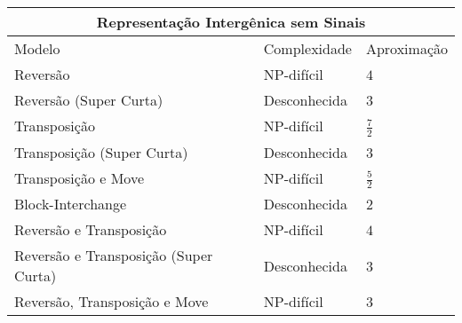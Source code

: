 \begin{table}[!htb]
  \begin{tabular}{|p{8cm}|p{3cm}|p{3cm}|}
    \hline
    \multicolumn{3}{|c|}{Representação Intergênica sem Sinais}                                                                                   \\ \hline
    Modelo                  & Complexidade                                 & Aproximação                                                         \\ \hline
    Reversão                                & NP-difícil~\cite{2020a-brito-etal}           & $4$~\cite{2020a-brito-etal}                         \\ \hline
    Reversão (Super Curta)                  & Desconhecida                                 & $3$~\cite{2019c-oliveira-etal}                      \\ \hline
    Transposição                            & NP-difícil~\cite{2021a-oliveira-etal}        & $\frac{7}{2}$~\cite{2021a-oliveira-etal}            \\ \hline
    Transposição (Super Curta)              & Desconhecida                                 & $3$~\cite{2019c-oliveira-etal}                      \\ \hline
    Transposição e Move                     & NP-difícil~\cite{2021a-oliveira-etal}        & $\frac{5}{2}$~\cite{2021a-oliveira-etal}            \\ \hline
    Block-Interchange                       & Desconhecida                                 & $2$~\cite{2019-dias-etal}                           \\ \hline
    Reversão e Transposição                 & NP-difícil~\cite{2020a-brito-etal}           & $4$~\cite{2021b-brito-etal}                         \\ \hline
    Reversão e Transposição (Super Curta)   & Desconhecida                                 & $3$~\cite{2019c-oliveira-etal}                      \\ \hline
    Reversão, Transposição e Move           & NP-difícil~\cite{2021b-brito-etal}           & $3$~\cite{2021b-brito-etal}                         \\ \hline
  \end{tabular}
\end{table}